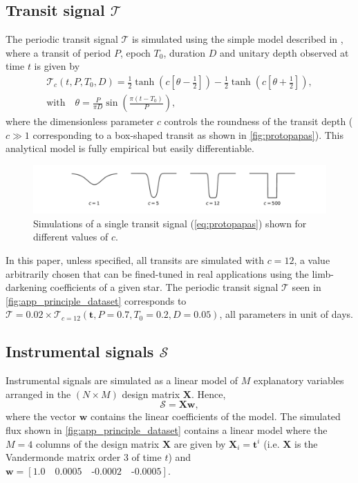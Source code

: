 \documentclass{aastex631}
\begin{document}
\subsection{Transit signal $\mathcal{T}$}\label{app_proto}
The periodic transit signal $\mathcal{T}$ is simulated using the simple model described in \cite{protopapas}, where a transit of period $P$, epoch $T_0$, duration $D$ and unitary depth observed at time $t$ is given by
\begin{equation}\label{eq:protopapas}
    \begin{gathered}
        \mathcal{T}_c(t, P, T_0, D) = \frac{1}{2}\tanh\left(c\left[\theta - \frac{1}{2}\right]\right) - \frac{1}{2}\tanh\left(c\left[\theta + \frac{1}{2}\right]\right), \\
        \text{with}\quad\theta = \frac{P}{\pi  D}\sin\left(\frac{\pi(t-T_0)}{P}\right),
    \end{gathered}
\end{equation}
where the dimensionless parameter $c$ controls the roundness of the transit depth ($c\gg1$ corresponding to a box-shaped transit as shown in \autoref{fig:protopapas}). This analytical model is fully empirical but easily differentiable.
\begin{figure}[H]
    \begin{centering}
        \includegraphics[width=\linewidth]{protopapas.pdf}
        \caption{Simulations of a single transit signal (\autoref{eq:protopapas}) shown for different values of $c$.}
        \label{fig:protopapas}
    \end{centering}
\end{figure}
\noindent In this paper, unless specified, all transits are simulated with $c=12$, a value arbitrarily chosen that can be fined-tuned in real applications using the limb-darkening coefficients of a given star. The periodic transit signal $\mathcal{T}$ seen in \autoref{fig:app_principle_dataset} corresponds to $\mathcal{T} = 0.02 \times \mathcal{T}_{c=12}(\bm{t}, P=0.7, T_0=0.2, D=0.05)$, all parameters in unit of days.

\subsection{Instrumental signals $\mathcal{S}$}
Instrumental signals are simulated as a linear model of $M$ explanatory variables arranged in the $(N\times M)$ design matrix $\bm{X}$. Hence,
$$
    \mathcal{S} = \bm{X w},
$$
where the vector $\bm{w}$ contains the linear coefficients of the model. The simulated flux shown in \autoref{fig:app_principle_dataset} contains a linear model where the $M=4$ columns of the design matrix $\bm{X}$ are given by $\bm{X}_{i} = \bm{t}^i$ (i.e. $\bm{X}$ is the Vandermonde matrix order $3$ of time $t$) and $\bm{w} = [1.0\quad0.0005\quad\text{-}0.0002\quad\text{-}0.0005].$
\end{document}
